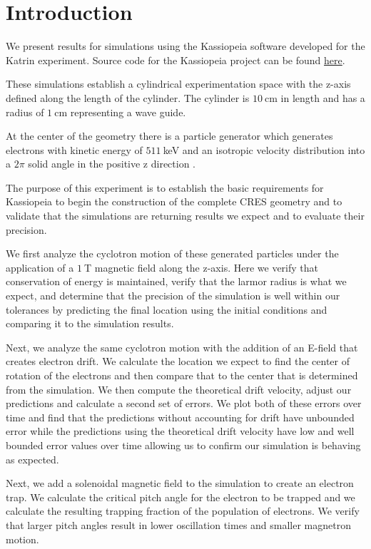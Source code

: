 \documentclass[12pt,letterpaper]{article}
\begin{document}
\section{Introduction}

We present results for simulations using the Kassiopeia software developed for the Katrin experiment. Source code for the Kassiopeia project can be found \href{https://github.com/KATRIN-Experiment/Kassiopeia}{here}. 

These simulations establish a cylindrical experimentation space with the z-axis defined along the length of the cylinder. The cylinder is $10~$cm in length and has a radius of $1~$cm representing a wave guide.

At the center of the geometry there is a particle generator which generates electrons with kinetic energy of $511~$keV and an isotropic velocity distribution into a $2\pi$ solid angle in the positive z direction .

The purpose of this experiment is to establish the basic requirements for Kassiopeia to begin the construction of the complete CRES geometry and to validate that the simulations are returning results we expect and to evaluate their precision.

We first analyze the cyclotron motion of these generated particles under the application of a $1~$T magnetic field along the z-axis. Here we verify that conservation of energy is maintained, verify that the larmor radius is what we expect, and determine that the precision of the simulation is well within our tolerances by predicting the final location using the initial conditions and comparing it to the simulation results. 

Next, we analyze the same cyclotron motion with the addition of an E-field that creates electron drift. We calculate the location we expect to find the center of rotation of the electrons and then compare that to the center that is determined from the simulation. We then compute the theoretical drift velocity, adjust our predictions and calculate a second set of errors. We plot both of these errors over time and find that the predictions without accounting for drift have unbounded error while the predictions using the theoretical drift velocity have low and well bounded error values over time allowing us to confirm our simulation is behaving as expected. 

Next, we add a solenoidal magnetic field to the simulation to create an electron trap. We calculate the critical pitch angle for the electron to be trapped and we calculate the resulting trapping fraction of the population of electrons. We verify that larger pitch angles result in lower oscillation times and smaller magnetron motion. 
\end{document}

